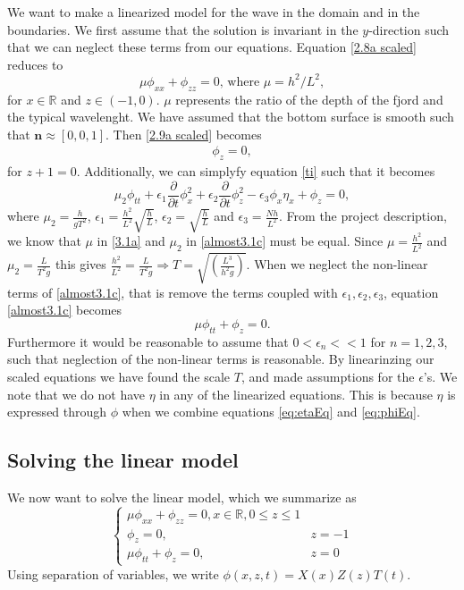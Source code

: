 \documentclass[11pt]{article}
\begin{document}
We want to make a linearized model for the wave in the domain and in the boundaries. We first assume that the solution is invariant in the $y$-direction such that we can neglect these terms from our equations. Equation \eqref{2.8a scaled} reduces to 
\begin{equation} \label{3.1a}
\mu \phi_{xx} + \phi_{zz} = 0\text{, where }\mu = h^2/L^2,
\end{equation}
for $x \in \mathbb{R}$ and $z \in (-1,0)$. $\mu$ represents the ratio of the depth of the fjord and the typical wavelenght.  We have assumed that the bottom surface is smooth such that  $\mathbf{n} \approx [0,0,1]$. Then \eqref{2.9a scaled} becomes
\begin{align*}
\phi_z = 0,
\end{align*}
for $z +1 = 0$.
Additionally, we can simplyfy equation \eqref{ti} such that it becomes
\begin{equation} \label{almost3.1c}
\mu_2 \phi_{tt} + \epsilon_1 \frac{\partial }{\partial t} \phi_x^2+ \epsilon_2 \frac{\partial }{\partial t}\phi_z^2 - \epsilon_3 \phi_x  \eta_x +  \phi_z  = 0,
\end{equation}
where $\mu_2=\frac{h}{gT^2}$, $\epsilon_1= \frac{h^2}{L^2} \sqrt{\frac{h}{L}}$, $\epsilon_2=\sqrt{\frac{h}{L}}$ and $\epsilon_3=\frac{Nh}{L^2}$.
From the project description, we know that $\mu$ in \eqref{3.1a} and $\mu_2$ in \eqref{almost3.1c} must be equal. Since $\mu=\frac{h^2}{L^2}$ and $\mu_2=\frac{L}{T^2g}$ this gives $\frac{h^2}{L^2}=\frac{L}{T^2g} \Rightarrow T=\sqrt{(\frac{L^3}{h^2g})}$.
When we neglect the non-linear terms of \eqref{almost3.1c}, that is remove the terms coupled with $\epsilon_1, \epsilon_2, \epsilon_3$, equation \eqref{almost3.1c} becomes
\begin{equation*}
\mu \phi_{tt}+ \phi_z=0.
\end{equation*}
Furthermore it would be reasonable to assume that $0<\epsilon_n<<1$ for $n=1,2,3$, such that neglection of the non-linear terms is reasonable. By linearinzing our scaled equations we have found the scale $T$, and made assumptions for the $\epsilon$'s. We note that we do not have $\eta$ in any of the linearized equations. This is because $\eta$ is expressed through $\phi$ when we combine equations \eqref{eq:etaEq} and \eqref{eq:phiEq}.

\subsection{Solving the linear model}
We now want to solve the linear model, which we summarize as
\begin{equation}
    \begin{cases}
		\label{eq-ana:sjefsproblemet}
		\mu \phi _{xx} + \phi_{zz} = 0, x \in \mathbb{R}, 0 \leq z \leq 1 \\
	    \phi _z = 0,    & z = -1 \\
	    \mu \phi_{tt} + \phi_z = 0, & z = 0
    \end{cases}
\end{equation}
Using separation of variables, we write $\phi(x,z,t) = X(x)Z(z)T(t)$.
\end{document}
